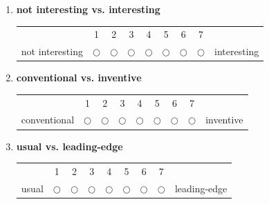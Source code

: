 \documentclass[inscr,ack,preface]{dithesis}
\begin{document}
\begin{appendix}
\begin{enumerate}
    \item \begin{minipage}[t]{\linewidth}
            \textbf{not interesting vs. interesting}
            \begin{center}
              \small
              \renewcommand{\arraystretch}{1.5}
              \begin{tabular}{ccccccccc}
                                & 1          & 2          & 3          & 4          & 5          & 6          & 7          &             \\
                not interesting & $\bigcirc$ & $\bigcirc$ & $\bigcirc$ & $\bigcirc$ & $\bigcirc$ & $\bigcirc$ & $\bigcirc$ & interesting
              \end{tabular}
            \end{center}
          \end{minipage}


    \item \begin{minipage}[t]{\linewidth}
            \textbf{conventional vs. inventive}
            \begin{center}
              \small
              \renewcommand{\arraystretch}{1.5}
              \begin{tabular}{ccccccccc}
                             & 1          & 2          & 3          & 4          & 5          & 6          & 7          &           \\
                conventional & $\bigcirc$ & $\bigcirc$ & $\bigcirc$ & $\bigcirc$ & $\bigcirc$ & $\bigcirc$ & $\bigcirc$ & inventive
              \end{tabular}
            \end{center}
          \end{minipage}


    \item \begin{minipage}[t]{\linewidth}
            \textbf{usual vs. leading-edge}
            \begin{center}
              \small
              \renewcommand{\arraystretch}{1.5}
              \begin{tabular}{ccccccccc}
                      & 1          & 2          & 3          & 4          & 5          & 6          & 7          &              \\
                usual & $\bigcirc$ & $\bigcirc$ & $\bigcirc$ & $\bigcirc$ & $\bigcirc$ & $\bigcirc$ & $\bigcirc$ & leading-edge
              \end{tabular}
            \end{center}
          \end{minipage}
  \end{enumerate}


\end{appendix}
\end{document}
